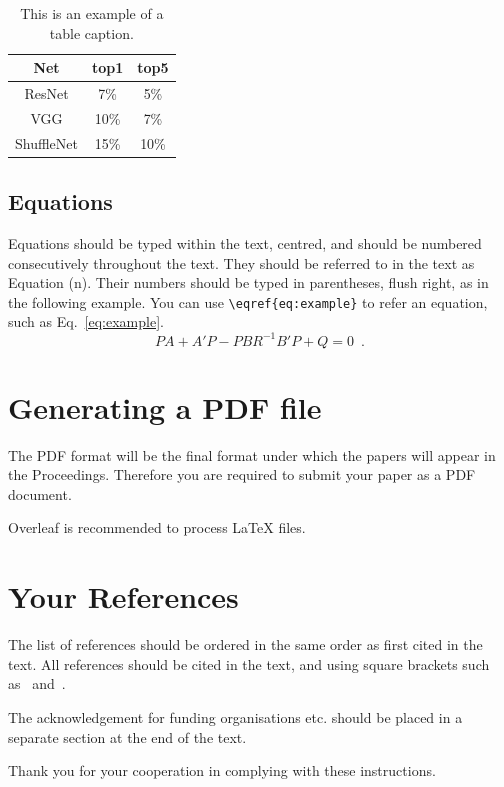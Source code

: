 \documentclass[10pt]{article}
\begin{document}
\begin{table}[h]
\centering\begin{tabular}{ccc}
\toprule
Net & top1 & top5 \\
\midrule
ResNet & 7\% & 5\% \\
VGG & 10\% & 7\% \\
ShuffleNet & 15\% & 10\% \\
\bottomrule
\end{tabular}
\caption{This is an example of a table caption.}
\label{tab:example}
\end{table}

\subsection{Equations}
Equations should be typed within the text, centred, and should
be numbered consecutively throughout the text. They should
be referred to in the text as Equation (n). Their numbers
should be typed in parentheses, flush right, as in the following
example. You can use \verb|\eqref{eq:example}| to refer an equation, such as Eq.~\eqref{eq:example}.
\begin{equation}
\label{eq:example}
	    PA + A'P - PBR^{-1}B'P + Q  =  0 \enspace.
\end{equation}

\section{Generating a {PDF} file}
The PDF format will be the final format under which the
papers will appear in the Proceedings. Therefore you are
required to submit your paper as a PDF document. 

Overleaf is recommended to process \LaTeX{} files.

\section{Your References}
The list of references should be ordered in the same order as
first cited in the text. All references should be cited in the
text, and using square brackets such as~\cite{ref01} and~\cite{ref01,ref02}. 

\acknowledgements
The acknowledgement for funding organisations etc. should
be placed in a separate section at the end of the text.

Thank you for your cooperation in complying with these
instructions.


\end{document}
